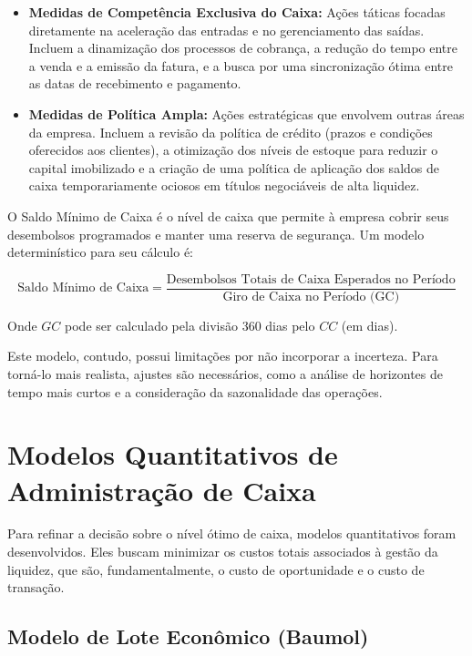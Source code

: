 \documentclass[
  a4paper,
]{book}
\begin{document}
\begin{itemize}
\item
  \textbf{Medidas de Competência Exclusiva do Caixa:} Ações táticas
  focadas diretamente na aceleração das entradas e no gerenciamento das
  saídas. Incluem a dinamização dos processos de cobrança, a redução do
  tempo entre a venda e a emissão da fatura, e a busca por uma
  sincronização ótima entre as datas de recebimento e pagamento.
\item
  \textbf{Medidas de Política Ampla:} Ações estratégicas que envolvem
  outras áreas da empresa. Incluem a revisão da política de crédito
  (prazos e condições oferecidos aos clientes), a otimização dos níveis
  de estoque para reduzir o capital imobilizado e a criação de uma
  política de aplicação dos saldos de caixa temporariamente ociosos em
  títulos negociáveis de alta liquidez.
\end{itemize}

O Saldo Mínimo de Caixa é o nível de caixa que permite à empresa cobrir
seus desembolsos programados e manter uma reserva de segurança. Um
modelo determinístico para seu cálculo é:

\[\text{Saldo Mínimo de Caixa} = \frac{\text{Desembolsos Totais de Caixa Esperados no Período}}{\text{Giro de Caixa no Período (GC)}}\]

Onde \(GC\) pode ser calculado pela divisão 360 dias pelo \(CC\) (em
dias).

Este modelo, contudo, possui limitações por não incorporar a incerteza.
Para torná-lo mais realista, ajustes são necessários, como a análise de
horizontes de tempo mais curtos e a consideração da sazonalidade das
operações.

\section{Modelos Quantitativos de Administração de
Caixa}\label{modelos-quantitativos-de-administrauxe7uxe3o-de-caixa}

Para refinar a decisão sobre o nível ótimo de caixa, modelos
quantitativos foram desenvolvidos. Eles buscam minimizar os custos
totais associados à gestão da liquidez, que são, fundamentalmente, o
custo de oportunidade e o custo de transação.

\subsection{Modelo de Lote Econômico
(Baumol)}\label{modelo-de-lote-econuxf4mico-baumol}
\end{document}
